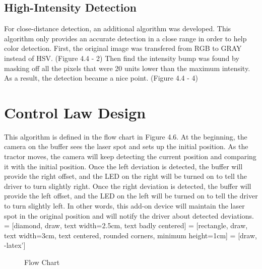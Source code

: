\subsection{High-Intensity Detection}

For close-distance detection, an additional algorithm was developed. This algorithm only  provides an accurate detection in a close range in order to help color detection. First, the original image was transfered from RGB to GRAY instead of HSV. (Figure 4.4 - 2) Then find the intensity bump was found by masking off all the pixels that were 20 units lower than the maximum intensity. As a result, the detection became a nice point. (Figure 4.4 - 4)

\section{Control Law Design}
This algorithm is defined in the flow chart in Figure 4.6. At the beginning, the camera on the buffer sees the laser spot and sets up the initial position. As the tractor moves, the camera will keep detecting the current position and comparing it with the initial position. Once the left deviation is detected, the buffer will provide the right offset, and the LED on the right will be turned on to tell the driver to turn slightly right. Once the right deviation is detected, the buffer will provide the left offset, and the LED on the left will be turned on to tell the driver to turn slightly left.  In other words, this add-on device will maintain the laser spot in the original position and will notify the driver about detected deviations. 
 = [diamond, draw, text width=2.5cm, text badly centered]
 = [rectangle, draw, text width=3cm, text centered, rounded corners, minimum height=1cm]
 = [draw, -latex']
\begin{figure}[ht!]
\begin{center}
\caption{Flow Chart}
\end{center}
\end{figure}